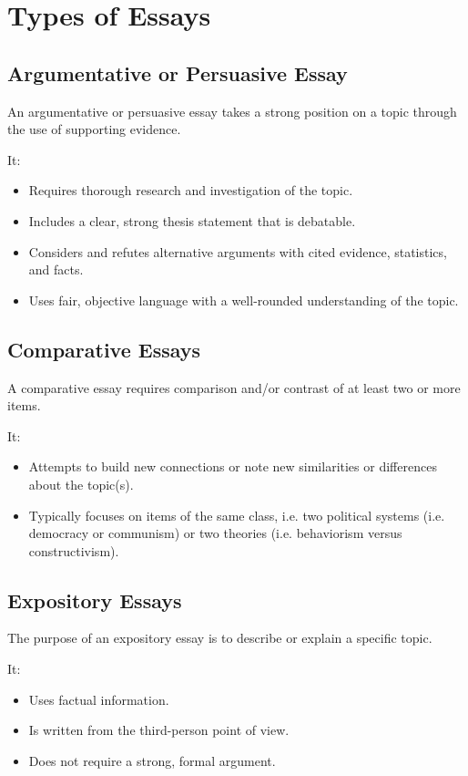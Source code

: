 \section{Types of Essays}
	\subsection{Argumentative or Persuasive Essay}
		An argumentative or persuasive essay takes a strong position on a topic through the use of supporting evidence.
		
		It:
		\begin{itemize}
			\item Requires thorough research and investigation of the topic.
			\item Includes a clear, strong thesis statement that is debatable.
			\item Considers and refutes alternative arguments with cited evidence, statistics, and facts.
			\item Uses fair, objective language with a well-rounded understanding of the topic.
		\end{itemize}
	
	\subsection{Comparative Essays}
		A comparative essay requires comparison and/or contrast of at least two or more items.
		
		It:
		\begin{itemize}
			\item Attempts to build new connections or note new similarities or differences about the topic(s).
			\item Typically focuses on items of the same class, i.e. two political systems (i.e. democracy or communism) or two theories (i.e. behaviorism versus constructivism).
		\end{itemize}
	
	\subsection{Expository Essays}
		The purpose of an expository essay is to describe or explain a specific topic.
		
		It:
		\begin{itemize}
			\item Uses factual information.
			\item Is written from the third-person point of view.
			\item Does not require a strong, formal argument.
		\end{itemize}

